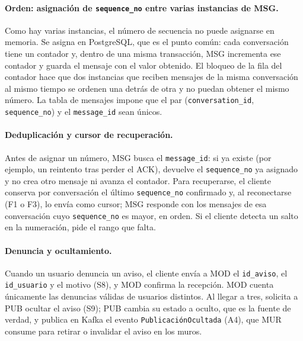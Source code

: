 \paragraph{Orden: asignación de \texttt{sequence\_no} entre varias instancias de MSG.}
Como hay varias instancias, el número de secuencia no puede asignarse en memoria. Se asigna
en PostgreSQL, que es el punto común: cada conversación tiene un contador y, dentro de una
misma transacción, MSG incrementa ese contador y guarda el mensaje con el valor obtenido. El
bloqueo de la fila del contador hace que dos instancias que reciben mensajes de la misma
conversación al mismo tiempo se ordenen una detrás de otra y no puedan obtener el mismo
número. La tabla de mensajes impone que el par (\texttt{conversation\_id},
\texttt{sequence\_no}) y el \texttt{message\_id} sean únicos.

\paragraph{Deduplicación y cursor de recuperación.}
Antes de asignar un número, MSG busca el \texttt{message\_id}: si ya existe (por ejemplo, un
reintento tras perder el ACK), devuelve el \texttt{sequence\_no} ya asignado y no crea otro
mensaje ni avanza el contador. Para recuperarse, el cliente conserva por conversación el
último \texttt{sequence\_no} confirmado y, al reconectarse (F1 o F3), lo envía como cursor;
MSG responde con los mensajes de esa conversación cuyo \texttt{sequence\_no} es mayor,
en orden. Si el cliente detecta un salto en la numeración, pide el rango que falta.

\paragraph{Denuncia y ocultamiento.}
Cuando un usuario denuncia un aviso, el cliente envía a MOD el \texttt{id\_aviso}, el
\texttt{id\_usuario} y el motivo (S8), y MOD confirma la recepción. MOD cuenta únicamente las
denuncias válidas de usuarios distintos. Al llegar a tres, solicita a PUB ocultar el aviso
(S9); PUB cambia su estado a oculto, que es la fuente de verdad, y publica en Kafka el evento
\texttt{PublicaciónOcultada} (A4), que MUR consume para retirar o invalidar el aviso en los
muros.

